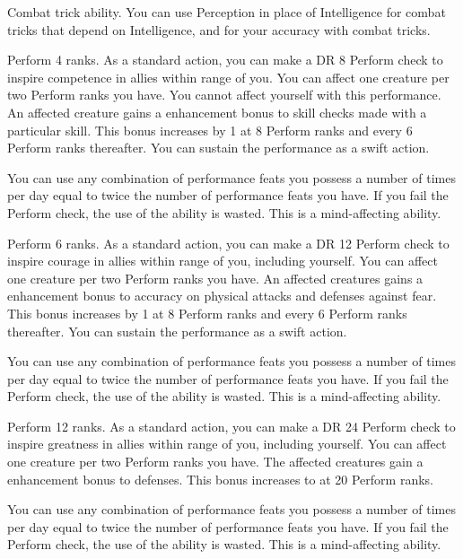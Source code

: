 \featpre Combat trick ability.
\featben You can use Perception in place of Intelligence for combat tricks that depend on Intelligence, and for your accuracy with combat tricks.

\featpre Perform 4 ranks.
\featben As a standard action, you can make a DR 8 Perform check to inspire competence in allies within \rngmed range of you.
You can affect one creature per two Perform ranks you have.
You cannot affect yourself with this performance.
An affected creature gains a  enhancement bonus to skill checks made with a particular skill.
This bonus increases by 1 at 8 Perform ranks and every 6 Perform ranks thereafter.
You can sustain the performance as a swift action.

You can use any combination of performance feats you possess a number of times per day equal to twice the number of performance feats you have.
If you fail the Perform check, the use of the ability is wasted.
This is a mind-affecting ability.

\featpre Perform 6 ranks.
\featben As a standard action, you can make a DR 12 Perform check to inspire courage in allies within \rngmed range of you, including yourself.
You can affect one creature per two Perform ranks you have.
An affected creatures gains a  enhancement bonus to accuracy on physical attacks and defenses against fear.
This bonus increases by 1 at 8 Perform ranks and every 6 Perform ranks thereafter.
You can sustain the performance as a swift action.

You can use any combination of performance feats you possess a number of times per day equal to twice the number of performance feats you have.
If you fail the Perform check, the use of the ability is wasted.
This is a mind-affecting ability.

\featpre Perform 12 ranks.
\featben As a standard action, you can make a DR 24 Perform check to inspire greatness in allies within \rngmed range of you, including yourself.
You can affect one creature per two Perform ranks you have.
The affected creatures gain a  enhancement bonus to defenses.
This bonus increases to  at 20 Perform ranks.

You can use any combination of performance feats you possess a number of times per day equal to twice the number of performance feats you have.
If you fail the Perform check, the use of the ability is wasted.
This is a mind-affecting ability.

